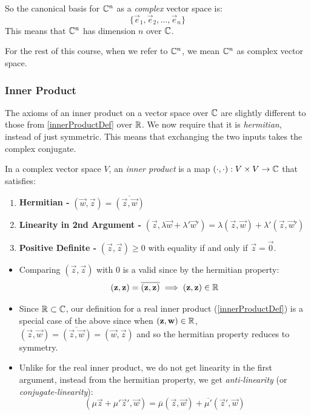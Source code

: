 \documentclass[../main.tex]{subfiles}
\begin{document}
So the canonical basis for $\mathbb{C}^{n}$ as a \textit{complex} vector space is:
\[
  \{\vec{e}_1, \vec{e}_2, \ldots, \vec{e}_n\}
\]
This means that $\mathbb{C}^{n}$ has dimension $n$ over $\mathbb{C}$.
\begin{remark}
  For the rest of this course, when we refer to $\mathbb{C}^{n}$, we mean $\mathbb{C}^{n}$ as complex vector space.
\end{remark}
\subsubsection{Inner Product}
\label{complexInnerProduct}
The axioms of an inner product on a vector space over $\mathbb{C}$ are slightly different to those from \cref{innerProductDef} over $\mathbb{R}$.
We now require that it is \textit{hermitian}, instead of just symmetric.
This means that exchanging the two inputs takes the complex conjugate.
\begin{definition}
  In a complex vector space $V$, an \textit{inner product} is a map $(\cdot, \cdot): V \times V \to \mathbb{C}$ that satisfies:
  \begin{enumerate}
    \item \textbf{Hermitian -} $(\vec{w}, \vec{z}) = \overline{(\vec{z}, \vec{w})}$
    \item \textbf{Linearity in 2nd Argument -} $(\vec{z}, \lambda \vec{w} + \lambda' \vec{w}') = \lambda(\vec{z}, \vec{w}) + \lambda'(\vec{z}, \vec{w}')$
    \item \textbf{Positive Definite -} $(\vec{z}, \vec{z}) \geq 0$ with equality if and only if $\vec{z} = \vec{0}$.
  \end{enumerate}
\end{definition}
\begin{remark}
  \begin{itemize}
    \item Comparing $(\vec{z}, \vec{z})$ with $0$ is a valid since by the hermitian property:
      \[
        (\mathbf{\bm{z}}, \mathbf{\bm{z}}) = \overline{(\mathbf{\bm{z}}, \mathbf{\bm{z}})} \implies (\mathbf{\bm{z}}, \mathbf{\bm{z}}) \in \mathbb{R}
      \]
    \item Since $\mathbb{R} \subset \mathbb{C}$, our definition for a real inner product (\cref{innerProductDef}) is a special case of the above since when $(\mathbf{\bm{z}}, \mathbf{\bm{w}}) \in \mathbb{R}$, $(\vec{z}, \vec{w}) = \overline{(\vec{z}, \vec{w})} = (\vec{w}, \vec{z})$ and so the hermitian property reduces to symmetry.
    \item Unlike for the real inner product, we do not get linearity in the first argument, instead from the hermitian property, we get \textit{anti-linearity} (or \textit{conjugate-linearity}):
      \[
        (\mu \vec{z} + \mu' \vec{z}', \vec{w}) = \overline{\mu}(\vec{z}, \vec{w}) + \overline{\mu'}(\vec{z}', \vec{w})
      \]
  \end{itemize}
\end{remark}
\end{document}
